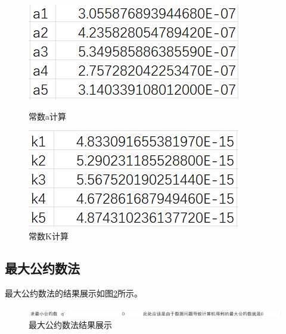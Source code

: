 \documentclass{ctexart}
\begin{document}
  \begin{figure}[H]
    \centering
    \begin{minipage}{0.45\textwidth}
      \centering
      \includegraphics[width=\linewidth]{consta.png}
      \caption{常数a计算}\label{consta}
    \end{minipage}%
    \hfill
    \begin{minipage}{0.45\textwidth}
      \centering
      \includegraphics[width=\linewidth]{constk.png}
      \caption{常数K计算}\label{constk}
    \end{minipage}
    \vspace{1em} %
  \end{figure}




  
  \subsection{最大公约数法}
  最大公约数法的结果展示如图\ref{zhijiefa}所示。

  \begin{figure}[H]
    \centering
    \includegraphics[height=0.03\textwidth,width=1\textwidth]{zhijiefa.png}
    \caption{最大公约数法结果展示}\label{zhijiefa}
  \end{figure}
\end{document}
